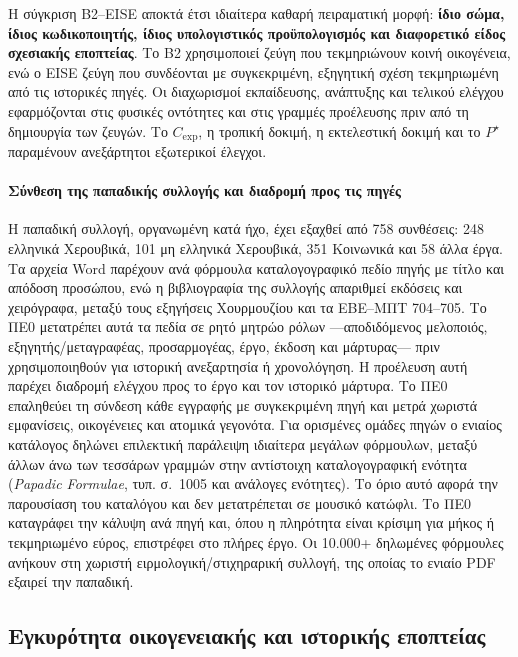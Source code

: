 \documentclass[11pt,a4paper]{article}
\begin{document}
Η σύγκριση B2--EISE αποκτά έτσι ιδιαίτερα καθαρή πειραματική μορφή: \textbf{ίδιο σώμα, ίδιος κωδικοποιητής, ίδιος υπολογιστικός προϋπολογισμός και διαφορετικό είδος σχεσιακής εποπτείας}. Το B2 χρησιμοποιεί ζεύγη που τεκμηριώνουν κοινή οικογένεια, ενώ ο EISE ζεύγη που συνδέονται με συγκεκριμένη, εξηγητική σχέση τεκμηριωμένη από τις ιστορικές πηγές. Οι διαχωρισμοί εκπαίδευσης, ανάπτυξης και τελικού ελέγχου εφαρμόζονται στις φυσικές οντότητες και στις γραμμές προέλευσης πριν από τη δημιουργία των ζευγών. Το $C_{\mathrm{exp}}$, η τροπική δοκιμή, η εκτελεστική δοκιμή και το $P^{\star}$ παραμένουν ανεξάρτητοι εξωτερικοί έλεγχοι.

\paragraph{Σύνθεση της παπαδικής συλλογής και διαδρομή προς τις πηγές}
Η παπαδική συλλογή, οργανωμένη κατά ήχο, έχει εξαχθεί από 758 συνθέσεις: 248 ελληνικά Χερουβικά, 101 μη ελληνικά Χερουβικά, 351 Κοινωνικά και 58 άλλα έργα. Τα αρχεία Word παρέχουν ανά φόρμουλα καταλογογραφικό πεδίο πηγής με τίτλο και απόδοση προσώπου, ενώ η βιβλιογραφία της συλλογής απαριθμεί εκδόσεις και χειρόγραφα, μεταξύ τους εξηγήσεις Χουρμουζίου και τα ΕΒΕ--ΜΠΤ 704--705. Το ΠΕ0 μετατρέπει αυτά τα πεδία σε ρητό μητρώο ρόλων ---αποδιδόμενος μελοποιός, εξηγητής/μεταγραφέας, προσαρμογέας, έργο, έκδοση και μάρτυρας--- πριν χρησιμοποιηθούν για ιστορική ανεξαρτησία ή χρονολόγηση. Η προέλευση αυτή παρέχει διαδρομή ελέγχου προς το έργο και τον ιστορικό μάρτυρα. Το ΠΕ0 επαληθεύει τη σύνδεση κάθε εγγραφής με συγκεκριμένη πηγή και μετρά χωριστά εμφανίσεις, οικογένειες και ατομικά γεγονότα. Για ορισμένες ομάδες πηγών ο ενιαίος κατάλογος δηλώνει επιλεκτική παράλειψη ιδιαίτερα μεγάλων φόρμουλων, μεταξύ άλλων άνω των τεσσάρων γραμμών στην αντίστοιχη καταλογογραφική ενότητα (\emph{Papadic Formulae}, τυπ. σ.~1005 και ανάλογες ενότητες). Το όριο αυτό αφορά την παρουσίαση του καταλόγου και δεν μετατρέπεται σε μουσικό κατώφλι. Το ΠΕ0 καταγράφει την κάλυψη ανά πηγή και, όπου η πληρότητα είναι κρίσιμη για μήκος ή τεκμηριωμένο εύρος, επιστρέφει στο πλήρες έργο. Οι 10.000+ δηλωμένες φόρμουλες ανήκουν στη χωριστή ειρμολογική/στιχηραρική συλλογή, της οποίας το ενιαίο PDF εξαιρεί την παπαδική.

\subsection{Εγκυρότητα οικογενειακής και ιστορικής εποπτείας}\label{app:corpora-supervision}
\end{document}
